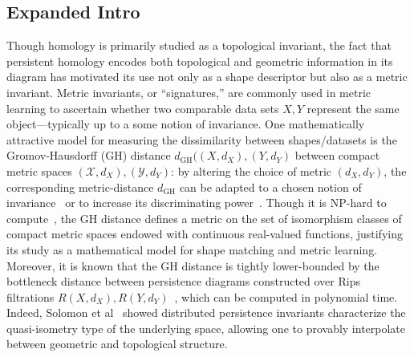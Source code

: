 \documentclass[10pt]{article}
\numberwithin{equation}{section}
\newcommand{\+}{%
	\raisebox{0.18ex}{\scaleobj{0.55}{+}}
}
\theoremstyle{definition}
\theoremstyle{definition}
\begin{document}
\subsection*{Expanded Intro}
Though homology is primarily studied as a topological invariant, the fact that persistent homology encodes both topological and geometric information in its diagram has motivated its use not only as a shape descriptor but also as a metric invariant. 
Metric invariants, or ``signatures,'' are commonly used in metric learning to ascertain whether two comparable data sets $X, Y$ represent the same object---typically up to a some notion of invariance.
One mathematically attractive model for measuring the dissimilarity between shapes/datasets is the Gromov-Hausdorff (GH) distance $d_{\text{GH}}((X, d_X), (Y,d_Y)$ between compact metric spaces $(\mathcal{X}, d_X), (\mathcal{Y}, d_Y)$: by altering the choice of metric $(d_X, d_Y)$, the corresponding metric-distance $d_{\text{GH}}$ can be adapted to a chosen notion of invariance~\cite{} or to increase its discriminating power~\cite{}. 
Though it is NP-hard to compute~\cite{}, the GH distance defines a metric on the set of isomorphism classes of compact metric spaces endowed with continuous real-valued functions, justifying its study as a mathematical model for shape matching and metric learning. 
Moreover, it is known that the GH distance is tightly lower-bounded by the bottleneck distance between persistence diagrams constructed over Rips filtrations $R(X, d_X), R(Y, d_Y)$~\cite{}, which can be computed in polynomial time. 
Indeed, Solomon et al~\cite{} showed distributed persistence invariants characterize the quasi-isometry type of the underlying space, allowing one to provably interpolate between geometric and topological structure.
\end{document}
